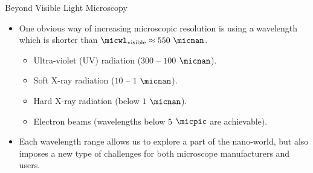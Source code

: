 \begin{frame}[c]{Beyond Visible Light Microscopy}
	\begin{itemize}
		\setlength\itemsep{0.4cm}
		\item<1-> One obvious way of increasing microscopic resolution is using a wavelength which is shorter than $\micwl_{\text{visible}} \approx 550~\micnan$.
		      \vspace{0.3cm}
		      \begin{itemize}
			      \setlength\itemsep{0.3cm}
			      \item<2-> Ultra-violet (UV) radiation ($300$ -- $100$ $\micnan$).
			      \item<3-> Soft X-ray radiation ($10$ -- $1$ $\micnan$).
			      \item<4-> Hard X-ray radiation (below $1$ $\micnan$).
			      \item<5-> Electron beams (wavelengths below $5$ $\micpic$ are achievable).
		      \end{itemize}
		\item<6-> Each wavelength range allows us to explore a part of the nano-world, but also imposes a new type of challenges for both microscope manufacturers and users.
	\end{itemize}
\end{frame}
